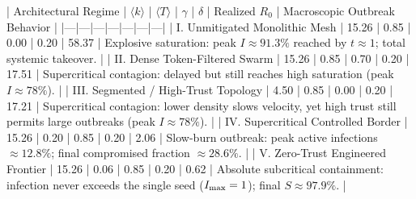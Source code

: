 | Architectural Regime | $\langle k \rangle$ | $\langle T \rangle$ | $\gamma$ | $\delta$ | Realized $R_0$ | Macroscopic Outbreak Behavior |
|---|---|---|---|---|---|---|
| I. Unmitigated Monolithic Mesh | 15.26 | 0.85 | 0.00 | 0.20 | 58.37 | Explosive saturation: peak $I \approx 91.3\%$ reached by $t \approx 1$; total systemic takeover. |
| II. Dense Token-Filtered Swarm | 15.26 | 0.85 | 0.70 | 0.20 | 17.51 | Supercritical contagion: delayed but still reaches high saturation (peak $I \approx 78\%$). |
| III. Segmented / High-Trust Topology | 4.50 | 0.85 | 0.00 | 0.20 | 17.21 | Supercritical contagion: lower density slows velocity, yet high trust still permits large outbreaks (peak $I \approx 78\%$). |
| IV. Supercritical Controlled Border | 15.26 | 0.20 | 0.85 | 0.20 | 2.06 | Slow-burn outbreak: peak active infections $\approx 12.8\%$; final compromised fraction $\approx 28.6\%$. |
| V. Zero-Trust Engineered Frontier | 15.26 | 0.06 | 0.85 | 0.20 | 0.62 | Absolute subcritical containment: infection never exceeds the single seed ($I_{\rm max}=1$); final $S \approx 97.9\%$. |

